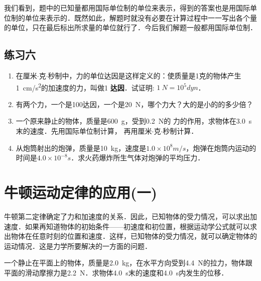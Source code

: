 我们看到，题中的已知量都用国际单位制的单位来表示，得到的答案也是用国际单位制的单位来表示的．既然如此，解题时就没有必要在计算过程中一一写出各个量的单位，只在最后标出所求量的单位就行了．今后我们解题一般都用国际单位制．


\subsection*{练习六}
\begin{enumerate}
    \item 在厘米$\cdot$克$\cdot$秒制中，力的单位达因是这样定义的：使质量是1克的物体产生\SI{1}{cm/s^2}的加速度的力，叫做1\textbf{ 达因}．试证明: $\SI{1}{N}={10^5}\si{dyn}$．
    \item 有两个力，一个是100达因，一个是\SI{20}{N}，哪个力大？大的是小的的多少倍？
    \item 一个原来静止的物体，质量是\SI{600}{g}，受到\SI{0.2}{N}的
          力的作用，求物体在\SI{3.0}{s}末的速度．先用国际单位制计算，
          再用厘米$\cdot$克$\cdot$秒制计算．
    \item 从炮筒射出的炮弹，质量是\SI{10}{kg}，速度是$1.0\times 10^8\si{m/s}$，炮弹在炮筒内运动的时间是$4.0\times 10^{-8}\si{s}$．求火药爆炸所生气体对炮弹的平均压力．

\end{enumerate}
\newpage
\section{牛顿运动定律的应用(一)}

牛顿第二定律确定了力和加速度的关系．因此，已知物体的受力情况，可以求出加速度．如果再知道物体的初始条件——初速度和初位置，根据运动学公式就可以求出物体在任意时刻的位置和速度．这样，已知物体的受力情况，就可以确定物体的运动情况．这是力学所要解决的一方面的问题．

\begin{example}
    一个静止在平面上的物体，质量是\SI{2.0}{kg}，在水平方向受到\SI{4.4}{N}的拉力，物体跟平面的滑动摩擦力是\SI{2.2}{N}．求物体\SI{4.0}{s}末的速度和\SI{4.0}{s}内发生的位移．
\end{example}

\begin{figure}[H]\centering
    \caption{}
\end{figure}

